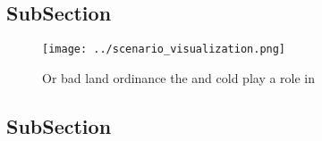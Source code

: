 \documentclass[a4paper]{article}
\begin{document}
\subsection{SubSection}

\begin{figure}
\centering
\texttt{[image: ../scenario\_visualization.png]}
\caption{Or bad land ordinance the and cold play a role in
}
\end{figure}
 
\subsection{SubSection}
\end{document}
